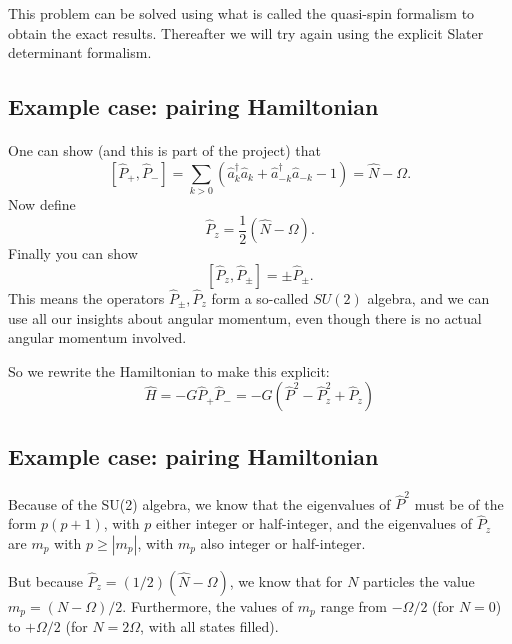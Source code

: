 \documentclass[%
oneside,                 %
final,                   %
10pt]{article}
\begin{document}
This problem can be solved using what is called the quasi-spin formalism to obtain the 
exact results. Thereafter we will try again using the explicit Slater determinant formalism.



\subsection*{Example case: pairing Hamiltonian}

\paragraph{}

One can show (and this is part of the project) that
\[
\left [ \hat{P}_+, \hat{P}_- \right ] = \sum_{k> 0} \left( \hat{a}^\dagger_k \hat{a}_k 
+ \hat{a}^\dagger_{-{k}} \hat{a}_{-{k}} - 1 \right) = \hat{N} - \Omega.
\]
Now define 
\[
\hat{P}_z = \frac{1}{2} ( \hat{N} -\Omega).
\]
Finally you can show
\[
\left [ \hat{P}_z , \hat{P}_\pm \right ] = \pm \hat{P}_\pm.
\]
This means the operators $\hat{P}_\pm, \hat{P}_z$ form a so-called  $SU(2)$ algebra, and we can 
use all our insights about angular momentum, even though there is no actual 
angular momentum involved.

So we rewrite the Hamiltonian to make this explicit:
\[
\hat{H} = -G \hat{P}_+ \hat{P}_- 
= -G \left( \hat{P}^2 - \hat{P}_z^2 + \hat{P}_z\right)
\]



\subsection*{Example case: pairing Hamiltonian}

\paragraph{}

Because of the SU(2) algebra, we know that the eigenvalues of 
$\hat{P}^2$ must be of the form $p(p+1)$, with $p$ either integer or half-integer, and the eigenvalues of $\hat{P}_z$ 
are $m_p$ with $p \geq | m_p|$, with $m_p$ also integer or half-integer. 

But because $\hat{P}_z = (1/2)(\hat{N}-\Omega)$, we know that for $N$ particles 
the value $m_p = (N-\Omega)/2$. Furthermore, the values of $m_p$ range from 
$-\Omega/2$ (for $N=0$) to $+\Omega/2$ (for $N=2\Omega$, with all states filled). 
\end{document}
